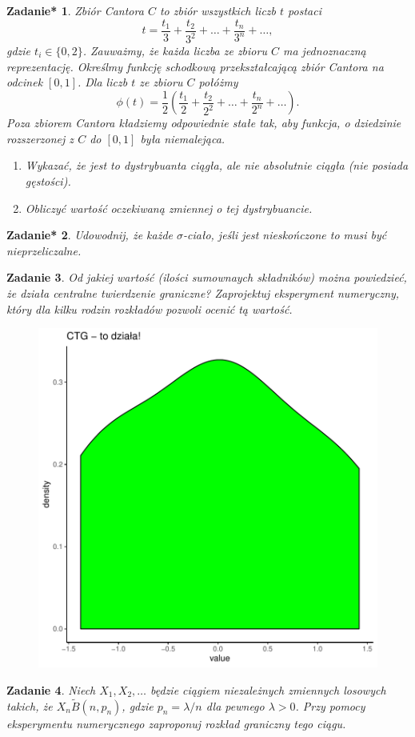 \documentclass{mwart}
\newtheorem{zd}{Zadanie}
\newtheorem{zdt}[zd]{Zadanie*}
\begin{document}
\begin{zdt}
Zbiór Cantora $C$ to zbiór wszystkich liczb $t$ postaci
\begin{displaymath}
t = \frac{t_1}{3} + \frac{t_2}{3^2} + \dots + \frac{t_n}{3^n}+\dots,
\end{displaymath}
gdzie $t_i\in \{0, 2\}$. Zauważmy, że każda liczba ze zbioru $C$ ma jednoznaczną reprezentację. Określmy funkcję schodkową przekształcającą zbiór Cantora na odcinek $[0, 1]$. Dla liczb $t$ ze zbioru $C$ połóżmy
\begin{displaymath}
\phi(t) = \frac{1}{2}\left(\frac{t_1}{2} + \frac{t_2}{2^2} + \dots + \frac{t_n}{2^n}+\dots\right).
\end{displaymath}
Poza zbiorem Cantora kładziemy odpowiednie stałe tak, aby funkcja, o dziedzinie rozszerzonej z $C$ do $[0, 1]$
była niemalejąca.
\begin{enumerate}
\item Wykazać, że jest to dystrybuanta ciągła, ale nie absolutnie ciągła (nie posiada gęstości).
\item Obliczyć wartość oczekiwaną zmiennej o tej dystrybuancie.
\end{enumerate}
\end{zdt}

\begin{zdt}
Udowodnij, że każde $\sigma$-ciało, jeśli jest nieskończone to musi być nieprzeliczalne.
\end{zdt}

\begin{zd}
Od jakiej wartość (ilości sumownaych składników) można powiedzieć, że działa centralne twierdzenie graniczne? Zaprojektuj eksperyment numeryczny, który dla kilku rodzin rozkładów pozwoli ocenić tą wartość.

\begin{figure}
\includegraphics{Zestaw1_PS_2020-004}
\end{figure}
\end{zd}

\begin{zd}
Niech $X_1, X_2, \dots$ będzie ciągiem niezależnych zmiennych losowych takich, że $X_n \tilde B(n, p_n)$, gdzie $p_n = \lambda/n$ dla pewnego $\lambda > 0$. Przy pomocy eksperymentu numerycznego zaproponuj rozkład graniczny tego ciągu.
\end{zd}
\end{document}
